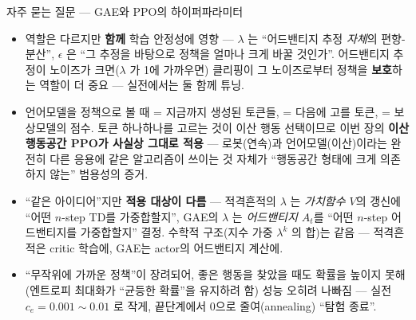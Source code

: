 \documentclass[aspectratio=169,11pt]{beamer}
\begin{document}
\begin{frame}{자주 묻는 질문 — GAE와 PPO의 하이퍼파라미터}
  \small
  \begin{itemize}
    \item {} 역할은 다르지만 \textbf{함께} 학습 안정성에 영향 —
      $\lambda$ 는 ``어드밴티지 추정 \textit{자체}의
      편향-분산'', $\epsilon$ 은 ``그 추정을 바탕으로 정책을
      얼마나 크게 바꿀 것인가''. 어드밴티지 추정이 노이즈가
      크면($\lambda$ 가 1에 가까우면) 클리핑이 그 노이즈로부터
      정책을 \textbf{보호}하는 역할이 더 중요 — 실전에서는 둘
      함께 튜닝.
    \item {}
      언어모델을 정책으로 볼 때  = 지금까지 생성된
      토큰들,  = 다음에 고를 토큰,  =
      보상모델의 점수. 토큰 하나하나를 고르는 것이 이산 행동
      선택이므로 이번 장의 \textbf{이산 행동공간 PPO가 사실상
      그대로 적용} — 로봇(연속)과 언어모델(이산)이라는 완전히
      다른 응용에 같은 알고리즘이 쓰이는 것 자체가 ``행동공간
      형태에 크게 의존하지 않는'' 범용성의 증거.
    \item {} ``같은 아이디어''지만
      \textbf{적용 대상이 다름} — 적격흔적의 $\lambda$ 는
      \textit{가치함수 $V$}의 갱신에 ``어떤 $n$-step TD를
      가중합할지'', GAE의 $\lambda$ 는 \textit{어드밴티지
      $A_t$}를 ``어떤 $n$-step 어드밴티지를 가중합할지'' 결정.
      수학적 구조(지수 가중 $\lambda^k$ 의 합)는 같음 —
      적격흔적은 critic 학습에, GAE는 actor의 어드밴티지
      계산에.
    \item {} ``무작위에
      가까운 정책''이 장려되어, 좋은 행동을 찾았을 때도 확률을
      높이지 못해(엔트로피 최대화가 ``균등한 확률''을 유지하려
      함) 성능 오히려 나빠짐 — 실전 $c_e=0.001\sim0.01$ 로
      작게, 끝단계에서 0으로 줄여(annealing) ``탐험 종료''.
  \end{itemize}
\end{frame}
\end{document}
